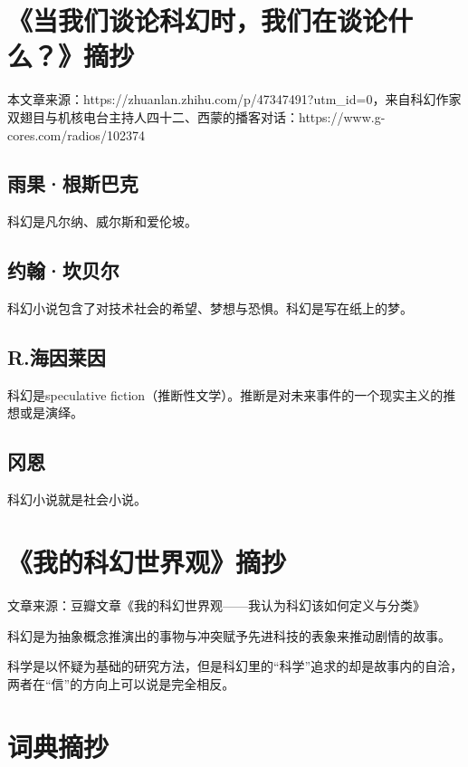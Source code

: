 \documentclass{ctexart}
\begin{document}
\section{《当我们谈论科幻时，我们在谈论什么？》摘抄}

本文章来源：https://zhuanlan.zhihu.com/p/47347491?utm\_id=0，来自科幻作家双翅目与机核电台主持人四十二、西蒙的播客对话：https://www.g-cores.com/radios/102374



\subsection{雨果·根斯巴克}

    科幻是凡尔纳、威尔斯和爱伦坡。



\subsection{约翰·坎贝尔}

    科幻小说包含了对技术社会的希望、梦想与恐惧。科幻是写在纸上的梦。



\subsection{R.海因莱因}

    科幻是speculative fiction（推断性文学）。推断是对未来事件的一个现实主义的推想或是演绎。



\subsection{冈恩}

    科幻小说就是社会小说。

\section{《我的科幻世界观》摘抄}

文章来源：豆瓣文章《我的科幻世界观——我认为科幻该如何定义与分类》

    科幻是为抽象概念推演出的事物与冲突赋予先进科技的表象来推动剧情的故事。

    科学是以怀疑为基础的研究方法，但是科幻里的“科学”追求的却是故事内的自洽，两者在“信”的方向上可以说是完全相反。

\section{词典摘抄}
\end{document}
